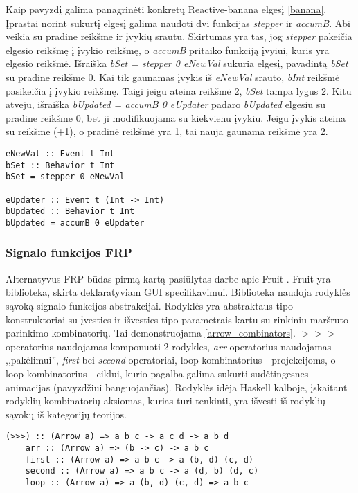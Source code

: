 Kaip pavyzdį galima panagrinėti konkretų Reactive-banana elgesį \ref{banana}. Įprastai norint sukurtį elgesį galima naudoti dvi funkcijas \textit{stepper} ir \textit{accumB}. Abi veikia su pradine reikšme ir įvykių srautu. Skirtumas yra tas, jog \textit{stepper} pakeičia elgesio reikšmę į įvykio reikšmę, o \textit{accumB} pritaiko funkciją įvyiui, kuris yra elgesio reikšmė. Išraiška \textit{bSet = stepper 0 eNewVal} sukuria elgesį, pavadintą \textit{bSet} su pradine reikšme 0. Kai tik gaunamas įvykis iš \textit{eNewVal} srauto, \textit{bInt} reikšmė pasikeičia į įvykio reikšmę. Taigi jeigu ateina reikšmė 2, \textit{bSet} tampa lygus 2.  Kitu atveju, išraiška \textit{bUpdated = accumB 0 eUpdater} padaro \textit{bUpdated} elgesiu su pradine reikšme 0, bet ji modifikuojama su kiekvienu įvykiu. Jeigu įvykis ateina su reikšme (+1), o pradinė reikšmė yra 1, tai nauja gaunama reikšmė yra 2.

\begin{lstlisting}[caption=- Reactive-banana elgesio pavyzdys, label=banana]
eNewVal :: Event t Int
bSet :: Behavior t Int
bSet = stepper 0 eNewVal
 
eUpdater :: Event t (Int -> Int)
bUpdated :: Behavior t Int
bUpdated = accumB 0 eUpdater
\end{lstlisting}

\subsubsection{Signalo funkcijos FRP}

Alternatyvus FRP būdas pirmą kartą pasiūlytas darbe apie Fruit \cite{Courtney01genuinelyfunctional}. Fruit yra biblioteka, skirta deklaratyviam GUI specifikavimui. Biblioteka naudoja rodyklės sąvoką signalo-funkcijos abstrakcijai. Rodyklės yra abstraktaus tipo konstruktoriai su įvesties ir išvesties tipo parametrais kartu su rinkiniu maršruto parinkimo kombinatorių. Tai demonstruojama \ref{arrow_combinators}. $>>>$ operatorius naudojamas komponuoti 2 rodykles, \textit{arr} operatorius naudojamas ,,pakėlimui'', \textit{first} bei \textit{second} operatoriai, loop kombinatorius  - projekcijoms, o loop kombinatorius - ciklui, kurio pagalba galima sukurti sudėtingesnes animacijas (pavyzdžiui banguojančias).  Rodyklės idėja Haskell kalboje, įskaitant rodyklių kombinatorių aksiomas, kurias turi tenkinti, yra išvesti iš rodyklių sąvokų iš kategorijų teorijos.

\begin{lstlisting}[caption=- rodyklių kombinatoriai, label=arrow_combinators]
	(>>>) :: (Arrow a) => a b c -> a c d -> a b d
	arr :: (Arrow a) => (b -> c) -> a b c
	first :: (Arrow a) => a b c -> a (b, d) (c, d)
	second :: (Arrow a) => a b c -> a (d, b) (d, c)
	loop :: (Arrow a) => a (b, d) (c, d) => a b c
\end{lstlisting}

